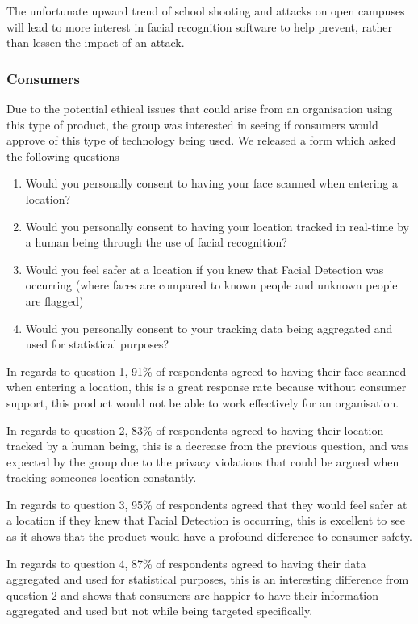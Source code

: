 \documentclass[
  english,
  a4paper,
,tablecaptionabove
]{scrartcl}
\providecommand{\tightlist}{%
  \setlength{\itemsep}{0pt}\setlength{\parskip}{0pt}}
\begin{document}
The unfortunate upward trend of school shooting and attacks on open
campuses will lead to more interest in facial recognition software to
help prevent, rather than lessen the impact of an attack.

\hypertarget{consumers}{%
\subsubsection{Consumers}\label{consumers}}

Due to the potential ethical issues that could arise from an
organisation using this type of product, the group was interested in
seeing if consumers would approve of this type of technology being used.
We released a form which asked the following questions

\begin{enumerate}
\def\labelenumi{\arabic{enumi}.}
\tightlist
\item
  Would you personally consent to having your face scanned when entering
  a location?
\item
  Would you personally consent to having your location tracked in
  real-time by a human being through the use of facial recognition?
\item
  Would you feel safer at a location if you knew that Facial Detection
  was occurring (where faces are compared to known people and unknown
  people are flagged)
\item
  Would you personally consent to your tracking data being aggregated
  and used for statistical purposes?
\end{enumerate}

In regards to question 1, 91\% of respondents agreed to having their
face scanned when entering a location, this is a great response rate
because without consumer support, this product would not be able to work
effectively for an organisation.

In regards to question 2, 83\% of respondents agreed to having their
location tracked by a human being, this is a decrease from the previous
question, and was expected by the group due to the privacy violations
that could be argued when tracking someones location constantly.

In regards to question 3, 95\% of respondents agreed that they would
feel safer at a location if they knew that Facial Detection is
occurring, this is excellent to see as it shows that the product would
have a profound difference to consumer safety.

In regards to question 4, 87\% of respondents agreed to having their
data aggregated and used for statistical purposes, this is an
interesting difference from question 2 and shows that consumers are
happier to have their information aggregated and used but not while
being targeted specifically.
\end{document}

